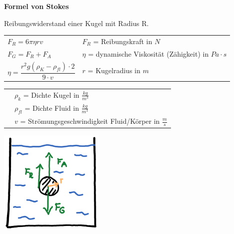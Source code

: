 			\newline
				\begin{minipage}{13cm}
					\textbf{Formel von Stokes}
						\begin{flushleft}
							Reibungswiderstand einer Kugel mit Radius R.
						\end{flushleft}
						\renewcommand{\arraystretch}{2.5}
						\begin{tabular}{ p{4cm} | p{7cm}}
							$F_R = 6 \pi \eta r v$	&	$F_R$ = Reibungskraft in $N$\\
							$F_G = F_R + F_A$	&	$\eta$ = dynamische Viskosität (Zähigkeit) in $Pa \cdot s$\\
							$\eta = \dfrac{r^2 g (\rho_K - \rho_{fl}) \cdot 2}{9 \cdot v}$	&	$r$ = Kugelradius in $m$\\
						\end{tabular}
						\renewcommand{\arraystretch}{1.5}
						\begin{tabular}{ p{4cm} | p{8cm} }
							& $\rho_{k}$ = Dichte Kugel in $\frac{kg}{m^3}$\\
							& $\rho_{fl}$ = Dichte Fluid in $\frac{kg}{m^3}$\\
							& $v$ = Strömungsgeschwindigkeit Fluid/Körper in $\frac{m}{s}$\\
						\end{tabular} 
						\renewcommand{\arraystretch}{1}
				\end{minipage}
				\begin{minipage}{10cm}
					\vspace{-\ht\strutbox}\includegraphics[width=5cm]{./bilder/StokesscheGleichung.png}
				\end{minipage}
				\newline
				\newline
				\newline
				\newline
